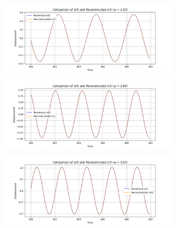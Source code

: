 \documentclass[11pt]{article}
\begin{document}
\begin{question}
	\begin{figure}[H]
		\centering
		\begin{subfigure}{\textwidth}
			\centering
			\includegraphics[width=\textwidth]{5/f1.png}
			\label{fig:f1}
		\end{subfigure}
		\begin{subfigure}{\textwidth}
			\centering
			\includegraphics[width=\textwidth]{5/f2.png}
			\label{fig:f2}
		\end{subfigure}
		\begin{subfigure}{\textwidth}
			\centering
			\includegraphics[width=\textwidth]{5/f3.png}
			\label{fig:f3}
		\end{subfigure}
	\end{figure}
	

\end{question}
\end{document}
